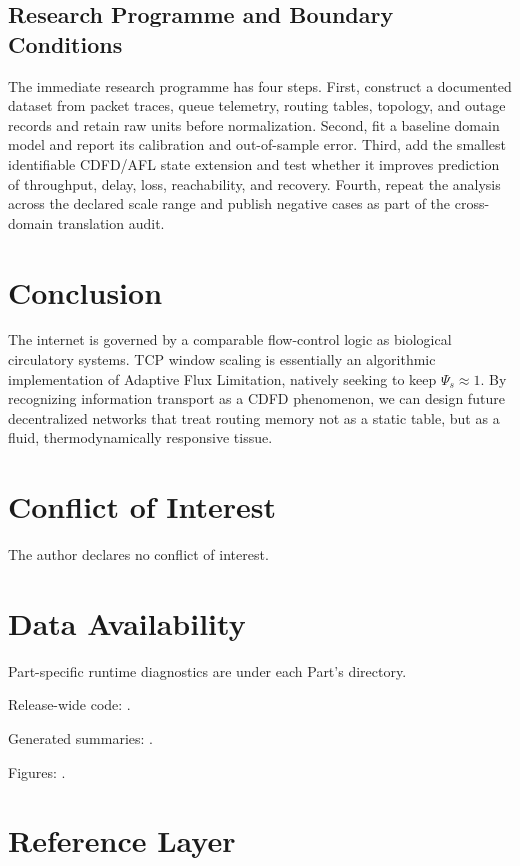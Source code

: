 \documentclass[11pt,a4paper]{article}
\begin{document}
\subsection{Research Programme and Boundary Conditions}

The immediate research programme has four steps. First, construct a documented
dataset from packet traces, queue telemetry, routing tables, topology, and outage records and retain raw units before normalization.
Second, fit a baseline domain model and report its calibration and out-of-sample
error. Third, add the smallest identifiable CDFD/AFL state extension and test
whether it improves prediction of throughput, delay, loss, reachability, and recovery. Fourth, repeat the
analysis across the declared scale range and publish negative cases as part of
the cross-domain translation audit.


\section{Conclusion}
The internet is governed by a comparable flow-control logic as biological circulatory systems. TCP window scaling is essentially an algorithmic implementation of Adaptive Flux Limitation, natively seeking to keep $\Psi_s \approx 1$. By recognizing information transport as a CDFD phenomenon, we can design future decentralized networks that treat routing memory not as a static table, but as a fluid, thermodynamically responsive tissue.
\section*{Conflict of Interest} The author declares no conflict of interest.
\section*{Data Availability}
Part-specific runtime diagnostics are under each Part's  directory.

Release-wide code: .

Generated summaries: .

Figures: .


\section{Reference Layer}


\end{document}
